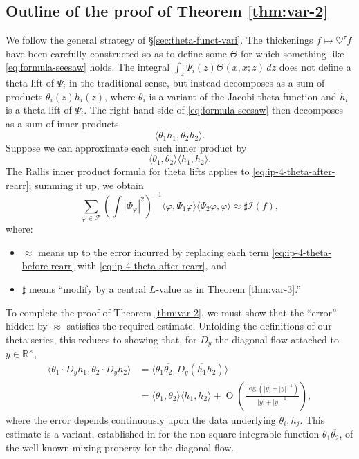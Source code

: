 \documentclass[reqno,10pt]{amsart}
\theoremstyle{plain} %
\theoremstyle{definition}
\theoremstyle{plain} %
\theoremstyle{remark}
\theoremstyle{itplain} %
\theoremstyle{remark} %
\numberwithin{equation}{section}
\def\O{\operatorname{O}}
\begin{document}
\subsection{Outline of the proof of Theorem \ref{thm:var-2}}
\label{sec-1-6}
We follow the general strategy of \S\ref{sec:theta-funct-vari}.  The thickenings $f \mapsto \heartsuit^{\tau} f$ have been carefully constructed so as to define some $\Theta$ for which something like \eqref{eq:formula-seesaw} holds.  The integral $\int_z \Psi_i(z) \Theta(x,x;z) \,d z$ does not define a theta lift of $\Psi_i$ in the traditional sense, but instead decomposes as a sum of products $\theta_i(z) h_i(z)$, where $\theta_i$ is a variant of the Jacobi theta function and $h_i$ is a theta lift of $\Psi_i$.  The right hand side of \eqref{eq:formula-seesaw} then decomposes as a sum of inner products
\begin{equation}\label{eq:ip-4-theta-before-rearr}
  \langle \theta_1 h_1, \theta_2 h_2 \rangle.
\end{equation}
Suppose we can approximate each such inner product by
\begin{equation}\label{eq:ip-4-theta-after-rearr}
  \langle \theta_1, \theta_2 \rangle \langle h_1, h_2 \rangle.
\end{equation}
The Rallis inner product formula \cite{2012arXiv1207.4709T,
  MR2837015}
for theta lifts applies to
\eqref{eq:ip-4-theta-after-rearr};
summing it up,
we obtain
\begin{equation}\label{eq:asymptotic-after-rallis-in-intro-sketch}
  \sum_{\varphi \in \mathcal{F}}
\left(\int |\Phi_\varphi|^2 \right)^{-1}
\langle \varphi, \Psi_1 \varphi  \rangle
\langle \Psi_2 \varphi, \varphi  \rangle
\approx
\sharp
\mathcal{I}(f),
\end{equation}
where:
\begin{itemize}
\item $\approx$ means up to the error incurred by replacing each term \eqref{eq:ip-4-theta-before-rearr} with \eqref{eq:ip-4-theta-after-rearr}, and
\item $\sharp$ means ``modify by a central $L$-value as in Theorem \ref{thm:var-3}.'' \end{itemize}
To complete the proof of Theorem \ref{thm:var-2}, we must show that the ``error'' hidden by $\approx$ satisfies the required estimate.  Unfolding the definitions of our theta series, this reduces to showing that, for $D_y$ the diagonal flow attached to $y \in \mathbb{R}^\times$,
\begin{align*}
  \langle \theta_1 \cdot D_y h_1, \theta_2 \cdot D_y h_2 \rangle
  &=
  \langle \theta_1 \overline{\theta_2}, D_y (\overline{h_1} h_2) \rangle \\
  &=
  \langle \theta_1, \theta_2 \rangle \langle h_1, h_2 \rangle
  + \O\left( 
    \frac{\log(|y| + |y|^{-1})}{|y| + |y|^{-1}} \right),
\end{align*}
where the error depends continuously upon the data underlying $\theta_i, h_j$.  This estimate is a variant, established in \cite{nelson-theta-squared} for the non-square-integrable function $\theta_1 \overline{\theta_2}$, of the well-known mixing property for the diagonal flow.
\end{document}
